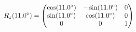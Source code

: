 \documentclass[preview]{standalone}
\begin{document}
\begin{align*}
\special{dvisvgm:raw <g id='unique000'>}R_z(11.0^\circ) = \begin{pmatrix} \cos(11.0^\circ) & -\sin(11.0^\circ) & 0 \\ \sin(11.0^\circ) & \cos(11.0^\circ) & 0 \\ 0 & 0 & 1 \end{pmatrix}\special{dvisvgm:raw </g>}
\end{align*}
\end{document}
